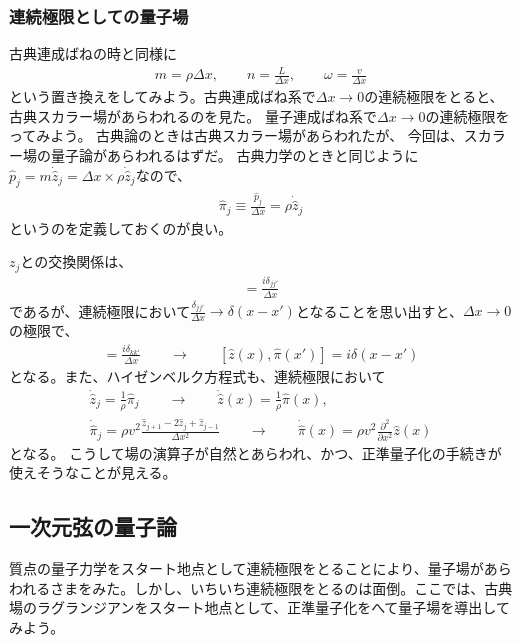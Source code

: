 \documentclass[10pt,a4paper]{jarticle}
\begin{document}
\subsubsection{連続極限としての量子場}
古典連成ばねの時と同様に
\begin{align}
m = \rho \Delta x, \qquad
n = \frac{L}{\Delta x}, \qquad
\omega = \frac{v}{\Delta x}
\end{align}
という置き換えをしてみよう。古典連成ばね系で$\Delta x \to 0$の連続極限をとると、古典スカラー場があらわれるのを見た。
量子連成ばね系で$\Delta x \to 0$の連続極限をってみよう。
古典論のときは古典スカラー場があらわれたが、
今回は、スカラー場の量子論があらわれるはずだ。
古典力学のときと同じように$\hat p_j = m \dot \hat z_j = \Delta x \times \rho \dot {\hat z}_j$なので、
\begin{align}
\hat \pi_j \equiv \frac{\hat p_j}{\Delta x} = \rho \dot {\hat z}_j
\end{align}
というのを定義しておくのが良い。

$z_j$との交換関係は、
\begin{align}
[\hat z_j, \hat \pi_{j'}] = \frac{i \delta_{j j'}}{\Delta x}
\end{align}
であるが、連続極限において$\displaystyle\frac{ \delta_{jj'} }{\Delta x} \to \delta(x-x')$となることを思い出すと、$\Delta x\to 0$の極限で、
\begin{align}
[\hat z_j, \hat \pi_{j'}] = \frac{i \delta_{kk'}}{\Delta x}
\qquad\rightarrow\qquad
[\hat z(x), \hat \pi(x')] = i \delta(x-x')
\end{align}
となる。また、ハイゼンベルク方程式も、連続極限において
\begin{align}
\dot{\hat z}_j =\frac{1}{\rho} \hat \pi_j \qquad\to\qquad \dot{\hat z}(x) =\frac{1}{\rho} \hat \pi(x), \\
\dot{\hat \pi}_j = \rho v^2 \frac{ \hat z_{j+1} - 2\hat z_j + \hat z_{j-1}  }{\Delta x^2} \qquad\to\qquad \dot{\hat \pi}(x) = \rho v^2 \frac{\partial^2}{\partial x^2}\hat z(x)
\end{align}
となる。
こうして場の演算子が自然とあらわれ、かつ、正準量子化の手続きが使えそうなことが見える。


\subsection{一次元弦の量子論}
質点の量子力学をスタート地点として連続極限をとることにより、量子場があらわれるさまをみた。しかし、いちいち連続極限をとるのは面倒。ここでは、古典場のラグランジアンをスタート地点として、正準量子化をへて量子場を導出してみよう。
\end{document}
